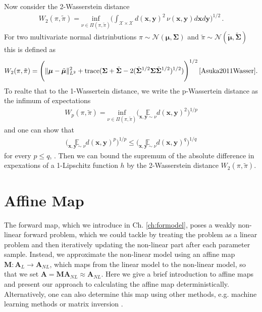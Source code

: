 Now consider the 2-Wasserstein distance
\begin{align}
	W_2(\pi,\tilde{\pi}) = \underset{  \nu \in \Pi(\pi,\tilde{\pi}) }{ \text{inf}}  \Bigg(\int_{\mathcal{X} \times \mathcal{X}} d(\bm{x},\bm{y})^2 \, \nu(\bm{x},\bm{y}) d\bm{x} d\bm{y} \Bigg)^{1/2}
	\label{eq:wass} \, .
\end{align}
For two multivariate normal distrinbutions $\pi \sim \mathcal{N}(\bm{\mu}, \bm{\Sigma})$ and $\tilde{\pi} \sim \mathcal{N}(\tilde{\bm{\mu}},  \tilde{\bm{\Sigma}})$this is defined as 
\begin{align}
	W_2(\pi,\tilde{\pi}) = \Bigg(  \lVert \bm{\mu} -\tilde{\bm{\mu}} \rVert^2_{L^2} + \text{trace}(\bm{\Sigma}+  \tilde{ \bm{\Sigma}} - 2 (\tilde{ \bm{\Sigma}}^{1/2} \bm{\Sigma} \tilde{ \bm{\Sigma}}^{1/2} )^{1/2} )  \Bigg)^{1/2} \, \text{\cite{Asuka2011Wasser}.}
\end{align}
To realte that to the 1-Wassertein distance, we write the p-Wassertein distance as the infimum of expectations
\begin{align}
	W_p(\pi,\tilde{\pi}) =  \underset{  \nu \in \Pi(\pi,\tilde{\pi}) }{ \text{inf}} \Bigg( \underset{ \bm{x},\bm{y} \sim  \nu  }{\mathbb{E}}  d(\bm{x},\bm{y})^2 \Bigg)^{1/p}
\end{align}
and one can show that
\begin{align}
 \Bigg(   \underset{ \bm{x},\bm{y} \sim  \nu  }{\mathbb{E}}  d(\bm{x},\bm{y})^p \Bigg)^{1/p} \leq  \Bigg(  \underset{ \bm{x},\bm{y} \sim  \nu  }{\mathbb{E}}  d(\bm{x},\bm{y})^q \Bigg)^{1/q}
\end{align}
for every $p \leq q$, \cite{Chizat2020LecNot}.
Then we can bound the supremum of the absolute difference in expexations of a 1-Lipschitz function $h$ by the 2-Wasserstein distance $W_2(\pi,\tilde{\pi})$.


\section{Affine Map}
\label{sec:affine}
The forward map, which we introduce in Ch. \ref{ch:formodel}, poses a weakly non-linear forward problem, which we could tackle by treating the problem as a linear problem and then iteratively updating the non-linear part after each parameter sample.
Instead, we approximate the non-linear model using an affine map $ \bm{M}:\bm{A}_L \rightarrow \bm{A}_{NL}$, which maps from the linear model to the non-linear model, so that we set $ \bm{A} = \bm{M} \bm{A}_{NL} \approx \bm{A}_{NL} $.
Here we give a brief introduction to affine maps and present our approach to calculating the affine map deterministically. 
Alternatively, one can also determine this map using other methods, e.g. machine learning methods or matrix inversion \cite{}.



